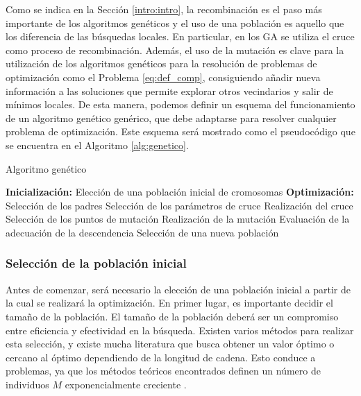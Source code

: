 Como se indica en la Sección \ref{intro:intro}, la recombinación es el paso más importante de los algoritmos genéticos y el uso de una población es aquello que los diferencia de las búsquedas locales. En particular, en los GA se utiliza el cruce como proceso de recombinación. Además, el uso de la mutación es clave para la utilización de los algoritmos genéticos para la resolución de problemas de optimización como el Problema \ref{eq:def_comp}, consiguiendo añadir nueva información a las soluciones que permite explorar otros vecindarios y salir de mínimos locales. De esta manera, podemos definir un esquema del funcionamiento de un algoritmo genético genérico, que debe adaptarse para resolver cualquier problema de optimización. Este esquema será mostrado como el pseudocódigo que se encuentra en el Algoritmo \ref{alg:genetico}.

\begin{algorithm}[!htb]
    \caption{Algoritmo genético}
    \label{alg:genetico}
    \begin{algorithmic}[1]
        \State \textbf{Inicialización:}
        \State Elección de una población inicial de cromosomas
        \State \textbf{Optimización:}
            \Repeat 
                    \State Selección de los padres
                    \State Selección de los parámetros de cruce
                    \State Realización del cruce
                \EndIf
                    \State Selección de los puntos de mutación
                    \State Realización de la mutación
                \EndIf
                \State Evaluación de la adecuación de la descendencia
            \State Selección de una nueva población
        \EndWhile
    \end{algorithmic}
\end{algorithm}

\subsubsection{Selección de la población inicial}\label{intro:sel-inicial}
Antes de comenzar, será necesario la elección de una población inicial a partir de la cual se realizará la optimización. En primer lugar, es importante decidir el tamaño de la población. El tamaño de la población deberá ser un compromiso entre eficiencia y efectividad en la búsqueda. Existen varios métodos para realizar esta selección, y existe mucha literatura que busca obtener un valor óptimo o cercano al óptimo dependiendo de la longitud de cadena. Esto conduce a problemas, ya que los métodos teóricos encontrados definen un número de individuos $M$ exponencialmente creciente \cite{goldberg1985optimal,goldberg1988sizing}.\\

